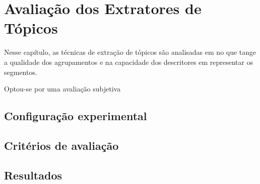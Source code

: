 \chapter{Avaliação dos Extratores de Tópicos}\label{cap-extratores}

Nesse capítulo, as técnicas de extração de tópicos são analisadas em no que tange a qualidade dos agrupamentos e na capacidade dos descritores em representar os segmentos. 

Optou-se por uma avaliação subjetiva 


\section{Configuração experimental}


\section{Critérios de avaliação}


\section{Resultados}



